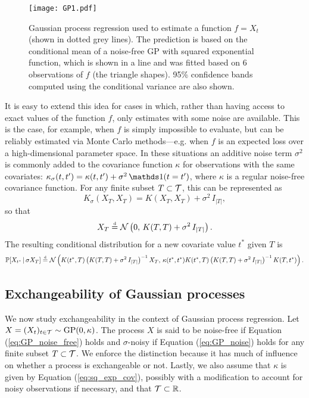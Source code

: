 \begin{figure}[h]
	\centering
	\texttt{[image: GP1.pdf]}
	\caption{Gaussian process regression used to estimate a function $f = X_t$ (shown in dotted grey lines). The prediction is based on the conditional mean of a noise-free GP with squared exponential function, which is shown in a line and was fitted based on 6 observations of $f$ (the triangle shapes). 95\% confidence bands computed using the conditional variance are also shown.}
	\label{fig:GP1}
\end{figure}



It is easy to extend this idea for cases in which, rather than having access to exact values of the function $f$, only estimates with some noise are available. This is the case, for example, when $f$ is simply impossible to evaluate, but can be reliably estimated via Monte Carlo methods---e.g. when $f$ is an expected loss over a high-dimensional parameter space. In these situations an additive noise term $\sigma^2$ is commonly added to the covariance function $\kappa$ for observations with the same covariates: $\kappa_{\sigma} (t, t') = \kappa(t, t') + \sigma^2 \, \indicator (t = t')$, where $\kappa$ is a regular noise-free covariance function. For any finite subset $T \subset \mathcal{T}$, this can be represented as
\begin{equation*}
	K_{\sigma} (X_T, X_T) = K(X_T, X_T) + \sigma^2 \, I_{|T|},
\end{equation*}
so that
\begin{equation} \label{eq:GP_noise}
	X_T \stackrel{\text{\rm\tiny d}}{=} \mathcal{N} \left( 0, \, K(T, T) + \sigma^2 \, I_{|T|} \right).
\end{equation}
The resulting conditional distribution for a new covariate value $t^{*}$ given $T$ is
\begin{equation*}
 \mathbb{P} [X_{t^{*}} \,| \, \sigma X_T ] \stackrel{\text{\rm\tiny d}}{=} \mathcal{N} \left( K(t^{*}, T) \left( K(T, T) + \sigma^2 \, I_{|T|} \right)^{-1} X_T, \, \kappa(t^{*}, t^{*}) K(t^{*}, T) \left( K(T, T) + \sigma^2 \, I_{|T|} \right)^{-1} K(T, t^{*})  \right).
\end{equation*}



\subsection{Exchangeability of Gaussian processes}


We now study exchangeability in the context of Gaussian process regression. Let $X = (X_t)_{t \in \mathcal{T}} \sim \mathrm{GP} (0, \kappa)$. The process $X$ is said to be noise-free if Equation (\ref{eq:GP_noise_free}) holds and $\sigma$-noisy if Equation (\ref{eq:GP_noise}) holds for any finite subset $T \subset \mathcal{T}$. We enforce the distinction because it has much of influence on whether a process is exchangeable or not. Lastly, we also assume that $\kappa$ is given by Equation (\ref{eq:sq_exp_cov}), possibly with a modification to account for noisy observations if necessary, and that $\mathcal{T} \subset \mathbb{R}$.



